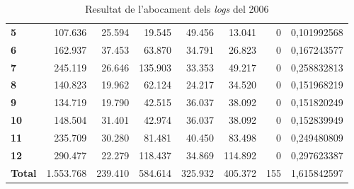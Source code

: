 \begin{table}[h!]
\begin{adjustbox}{width=1.5\textwidth, center}
\begin{tabular}{|l|r|r|r|r|r|r|r|}
            \midrule
            \textbf{5}     & 107.636      & 25.594     & 19.545     & 49.456     & 13.041     & 0            & 0,101992568          \\
            \textbf{6}     & 162.937      & 37.453     & 63.870     & 34.791     & 26.823     & 0            & 0,167243577          \\
            \textbf{7}     & 245.119      & 26.646     & 135.903    & 33.353     & 49.217     & 0            & 0,258832813          \\
            \textbf{8}     & 140.823      & 19.962     & 62.124     & 24.217     & 34.520     & 0            & 0,151968219          \\
            \midrule
            \textbf{9}     & 134.719      & 19.790     & 42.515     & 36.037     & 38.092     & 0            & 0,151820249          \\
            \textbf{10}    & 148.504      & 31.401     & 42.974     & 36.037     & 38.092     & 0            & 0,152839949          \\
            \textbf{11}    & 235.709      & 30.280     & 81.481     & 40.450     & 83.498     & 0            & 0,249480809          \\
            \textbf{12}    & 290.477      & 22.279     & 118.437    & 34.869     & 114.892    & 0            & 0,297623387          \\
            \midrule
            \textbf{Total} & 1.553.768    & 239.410    & 584.614    & 325.932    & 405.372    & 155          & 1,615842597          \\
            \bottomrule
        \end{tabular}
    \end{adjustbox}
    \caption{Resultat de l'abocament dels \textit{logs} del 2006}
    \label{tab:logs-table-2006}
\end{table}
